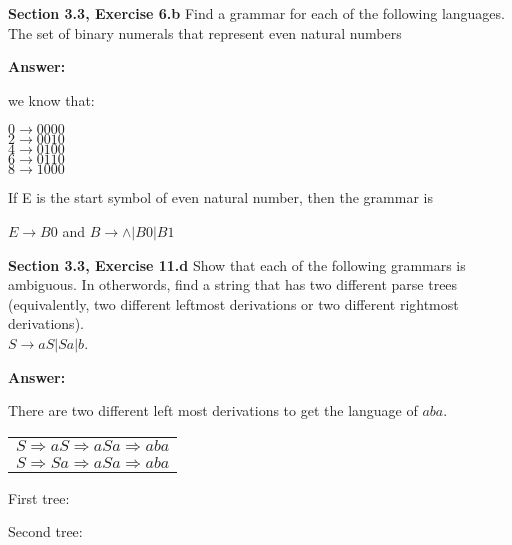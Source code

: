 \documentclass[12pt]{article}
\begin{document}
\textbf{Section 3.3, Exercise 6.b} Find a grammar for each of the following languages.\\
The set of binary numerals that represent even natural numbers

\textbf{Answer:}

we know that: 
\begin{center}
$0 \rightarrow 0000$ \\
$2 \rightarrow 0010$ \\
$4 \rightarrow 0100$ \\
$6 \rightarrow 0110$ \\
$8 \rightarrow 1000$ \\   
\end{center}

If E is the start symbol of even natural number, then the grammar is 
\begin{center}
$E \rightarrow B0$ and $B \rightarrow \wedge|B0|B1$ \\
\end{center}

\textbf{Section 3.3, Exercise 11.d} Show that each of the following grammars is ambiguous. 
In otherwords, find a string that has two different parse trees (equivalently, two
different leftmost derivations or two different rightmost derivations).\\
$S \rightarrow aS | Sa | b$.

\textbf{Answer:}

There are two different left most derivations to get the language of $aba$.
\begin{center}
\begin{tabular}{l}
$S \Rightarrow aS \Rightarrow aSa \Rightarrow aba$ \\
$S \Rightarrow Sa \Rightarrow aSa \Rightarrow aba$ \\
\end{tabular}
\end{center}

First tree:
\begin{center}
\end{center}

Second tree:
\begin{center}
\end{center}
\end{document}
